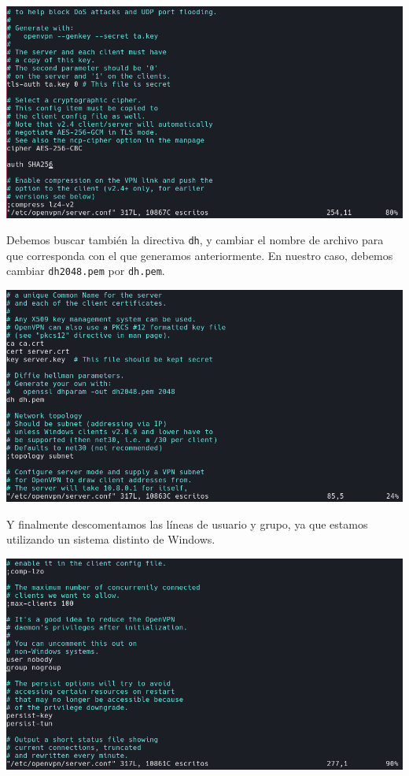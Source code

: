 \documentclass[11pt,a4paper]{article}
\begin{document}
\medskip

\begin{center}
\includegraphics[scale=0.4]{auth-256.png}
\end{center}

\medskip

Debemos buscar también la directiva \texttt{dh}, y cambiar el nombre de archivo para que corresponda con el que generamos anteriormente. En nuestro caso, debemos cambiar \texttt{dh2048.pem} por \texttt{dh.pem}.

\medskip

\begin{center}
\includegraphics[scale=0.4]{dh-pem.png}
\end{center}

\medskip

Y finalmente descomentamos las líneas de usuario y grupo, ya que estamos utilizando un sistema distinto de Windows.

\medskip

\begin{center}
\includegraphics[scale=0.4]{nobody-nogroup.png}
\end{center}
\end{document}
